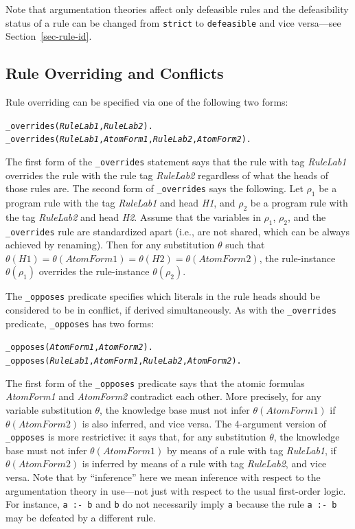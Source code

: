 \documentclass[11pt]{article}
\begin{document}
Note that argumentation theories affect only defeasible rules and the
defeasibility status of a rule can be changed from \texttt{strict} to
\texttt{defeasible} and vice versa---see
Section~\ref{sec-rule-id}.

\subsection{Rule Overriding and Conflicts}\label{sec-overriding-conflict}

Rule overriding can be specified via one of the following two forms:
\begin{alltt}
  _overrides({\em{}RuleLab1},\emph{RuleLab2}).
  _overrides({\em{}RuleLab1},{\em{}AtomForm1},{\em{}RuleLab2},\emph{AtomForm2}).
\end{alltt}
The first form of the {\tt \_overrides} statement says that the rule with
tag \emph{RuleLab1} overrides the rule with the rule tag
\emph{RuleLab2} regardless of what the heads of those rules are. The second
form of {\tt \_overrides} says the following. Let $\rho_1$ be a program
rule with the tag \emph{RuleLab1} and head \emph{H1}, and $\rho_2$ be a
program rule with the tag \emph{RuleLab2} and head \emph{H2}. Assume that
the variables in $\rho_1$, $\rho_2$, and the {\tt \_overrides} rule are
standardized apart (i.e., are not shared, which can be always achieved by
renaming).   Then for any substitution $\theta$ such that $\theta(H1) =
\theta(AtomForm1) = \theta(H2) = \theta(AtomForm2)$, the rule-instance
$\theta(\rho_1)$ overrides the rule-instance $\theta(\rho_2)$.

The {\tt \_opposes} predicate specifies which literals in the rule heads
should be considered to be in conflict, if derived simultaneously. As with the
{\tt \_overrides} predicate, {\tt \_opposes} has two forms:
\begin{alltt}
  _opposes({\em{}AtomForm1},\emph{AtomForm2}).
  _opposes({\em{}RuleLab1},{\em{}AtomForm1},{\em{}RuleLab2},\emph{AtomForm2}).
\end{alltt}
The first form of the {\tt \_opposes} predicate says that the atomic
formulas \emph{AtomForm1} and \emph{AtomForm2} contradict each other.  More
precisely, for any variable substitution $\theta$, the knowledge
base must not infer $\theta(AtomForm1)$ if $\theta(AtomForm2)$ is also
inferred, and vice versa.  The 4-argument version of {\tt \_opposes} is
more restrictive: it says that, for any substitution $\theta$, the
knowledge base must not infer $\theta(AtomForm1)$ by means of a rule with
tag \emph{RuleLab1}, if $\theta(AtomForm2)$ is inferred by means of a
rule with tag \emph{RuleLab2}, and vice versa.
Note that by ``inference'' here we mean inference with respect to the
argumentation theory in use---not just
with respect to the usual first-order logic. For instance, {\tt a :- b} and
{\tt b} do not necessarily imply {\tt a} because the rule {\tt a :-
  b} may be defeated by a different rule.      
\end{document}
